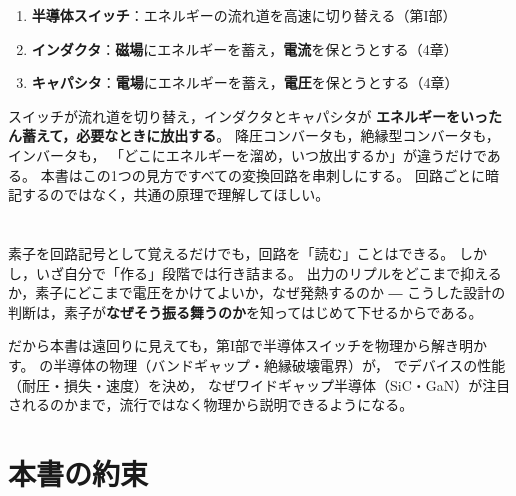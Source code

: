 \begin{screen}
\begin{enumerate}
\item \textbf{半導体スイッチ}：エネルギーの流れ道を高速に切り替える（第I部）
\item \textbf{インダクタ}：\textbf{磁場}にエネルギーを蓄え，\textbf{電流}を保とうとする（4章）
\item \textbf{キャパシタ}：\textbf{電場}にエネルギーを蓄え，\textbf{電圧}を保とうとする（4章）
\end{enumerate}
\end{screen}

スイッチが流れ道を切り替え，インダクタとキャパシタが
\textbf{エネルギーをいったん蓄えて，必要なときに放出する}。
降圧コンバータも，絶縁型コンバータも，インバータも，
「どこにエネルギーを溜め，いつ放出するか」が違うだけである。
本書はこの1つの見方ですべての変換回路を串刺しにする。
回路ごとに暗記するのではなく，共通の原理で理解してほしい。

\section*{}

素子を回路記号として覚えるだけでも，回路を「読む」ことはできる。
しかし，いざ自分で「作る」段階では行き詰まる。
出力のリプルをどこまで抑えるか，素子にどこまで電圧をかけてよいか，なぜ発熱するのか ―
こうした設計の判断は，素子が\textbf{なぜそう振る舞うのか}を知ってはじめて下せるからである。

だから本書は遠回りに見えても，第I部で半導体スイッチを物理から解き明かす。
の半導体の物理（バンドギャップ・絶縁破壊電界）が，
でデバイスの性能（耐圧・損失・速度）を決め，
なぜワイドギャップ半導体（SiC・GaN）が注目されるのかまで，流行ではなく物理から説明できるようになる。

\section*{本書の約束}

